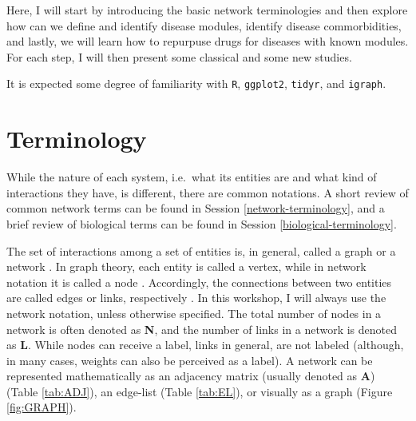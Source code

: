 \documentclass[
]{book}
\begin{document}
Here, I will start by introducing the basic network terminologies and then explore how can we define and identify disease modules, identify disease commorbidities, and lastly, we will learn how to repurpuse drugs for diseases with known modules. For each step, I will then present some classical and some new studies.

It is expected some degree of familiarity with \texttt{R}, \texttt{ggplot2}, \texttt{tidyr}, and \texttt{igraph}.

\hypertarget{terminology}{%
\section{Terminology}\label{terminology}}

While the nature of each system, i.e.~what its entities are and what kind of interactions they have, is different, there are common notations. A short review of common network terms can be found in Session \ref{network-terminology}, and a brief review of biological terms can be found in Session \ref{biological-terminology}.

The set of interactions among a set of entities is, in general, called a graph or a network \citep{Newman2018, Barabasi2016}. In graph theory, each entity is called a vertex, while in network notation it is called a node \citep{Barabasi2016}. Accordingly, the connections between two entities are called edges or links, respectively \citep{Barabasi2016}. In this workshop, I will always use the network notation, unless otherwise specified. The total number of nodes in a network is often denoted as \textbf{N}, and the number of links in a network is denoted as \textbf{L}. While nodes can receive a label, links in general, are not labeled \citep{Barabasi2016} (although, in many cases, weights can also be perceived as a label). A network can be represented mathematically as an adjacency matrix (usually denoted as \textbf{A}) (Table \ref{tab:ADJ}), an edge-list (Table \ref{tab:EL}), or visually as a graph (Figure \ref{fig:GRAPH}).
\end{document}
